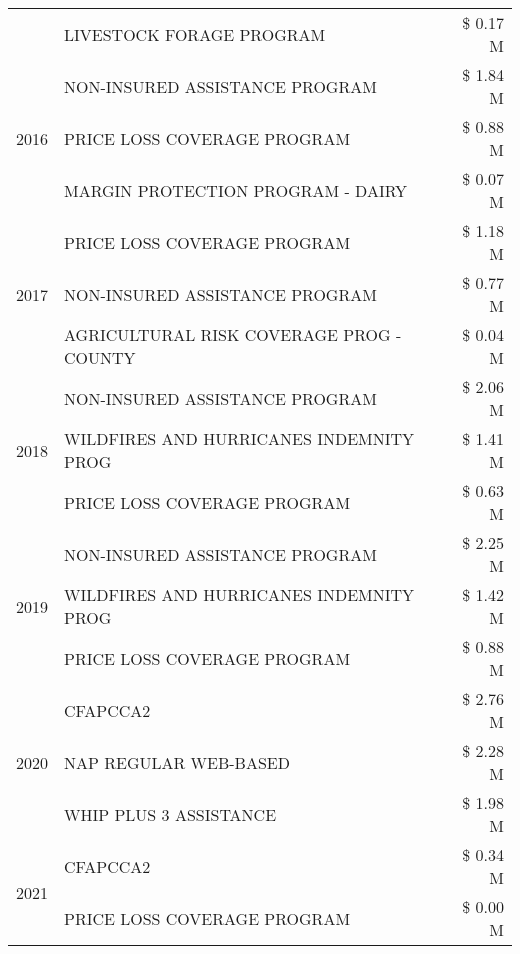 \begin{tabular}{llr}
 & LIVESTOCK FORAGE PROGRAM & \$ 0.17 M \\
\cline{1-3}
\multirow[t]{3}{*}{2016} & NON-INSURED ASSISTANCE PROGRAM                & \$ 1.84 M \\
 & PRICE LOSS COVERAGE PROGRAM                   & \$ 0.88 M \\
 & MARGIN PROTECTION PROGRAM - DAIRY             & \$ 0.07 M \\
\cline{1-3}
\multirow[t]{3}{*}{2017} & PRICE LOSS COVERAGE PROGRAM & \$ 1.18 M \\
 & NON-INSURED ASSISTANCE PROGRAM & \$ 0.77 M \\
 & AGRICULTURAL RISK COVERAGE PROG - COUNTY & \$ 0.04 M \\
\cline{1-3}
\multirow[t]{3}{*}{2018} & NON-INSURED ASSISTANCE PROGRAM & \$ 2.06 M \\
 & WILDFIRES AND HURRICANES INDEMNITY PROG & \$ 1.41 M \\
 & PRICE LOSS COVERAGE PROGRAM & \$ 0.63 M \\
\cline{1-3}
\multirow[t]{3}{*}{2019} & NON-INSURED ASSISTANCE PROGRAM & \$ 2.25 M \\
 & WILDFIRES AND HURRICANES INDEMNITY PROG & \$ 1.42 M \\
 & PRICE LOSS COVERAGE PROGRAM & \$ 0.88 M \\
\cline{1-3}
\multirow[t]{3}{*}{2020} & CFAPCCA2 & \$ 2.76 M \\
 & NAP REGULAR WEB-BASED & \$ 2.28 M \\
 & WHIP PLUS 3 ASSISTANCE & \$ 1.98 M \\
\cline{1-3}
\multirow[t]{2}{*}{2021} & CFAPCCA2 & \$ 0.34 M \\
 & PRICE LOSS COVERAGE PROGRAM & \$ 0.00 M \\
\cline{1-3}
\bottomrule
\end{tabular}
